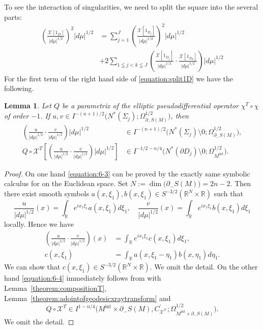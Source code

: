 \documentclass[a4paper,11pt,reqno]{amsart}
\numberwithin{equation}{section}
\newtheorem{lemma}[theorem]{Lemma}
\theoremstyle{definition}
\theoremstyle{remark}
\begin{document}
%
%
To see the interaction of singularities, we need to split the square into the several parts:
%
%
\begin{align}
  \left(
  \frac{\mathcal{X}[1_D]}{\lvert{d\mu}\rvert^{1/2}}
  \right)^2
  \lvert{d\mu}\rvert^{1/2}
& =
  \sum_{j=1}^J
  \left(
  \frac{\mathcal{X}[1_{D_j}]}{\lvert{d\mu}\rvert^{1/2}}
  \right)^2
  \lvert{d\mu}\rvert^{1/2}
\nonumber
\\
& +
  2
  \sum_{1 \leqq j < k \leqq J}
  \left(
  \frac{\mathcal{X}[1_{D_j}]}{\lvert{d\mu}\rvert^{1/2}}
  \cdot
  \frac{\mathcal{X}[1_{D_k}]}{\lvert{d\mu}\rvert^{1/2}}
  \right)
  \lvert{d\mu}\rvert^{1/2}
\label{equation:split1D}
\end{align}
%
%
For the first term of the right hand side of \eqref{equation:split1D} we have the following. 
%
%
\begin{lemma}
\label{theorem:6-2}
Let $Q$ be a parametrix of the elliptic pseudodifferential operator $\chi^T\circ\chi$ of order $-1$. 
If $u,v \in I^{-(n+1)/2}\bigl(N^\ast(\Sigma_j); \Omega_{\partial_-S(M)}^{1/2}\bigr)$, then 
%
%
\begin{align}
  \left(
  \frac{u}{\lvert{d\mu}\rvert^{1/2}}
  \cdot
  \frac{v}{\lvert{d\mu}\rvert^{1/2}}
  \right)
  \lvert{d\mu}\rvert^{1/2}
& \in 
  I^{-(n+1)/2}\bigl(N^\ast(\Sigma_j)\setminus0; \Omega_{\partial_-S(M)}^{1/2}\bigr),
\label{equation:6-3} 
\\
  Q\circ\mathcal{X}^T
  \left[
  \left(
  \frac{u}{\lvert{d\mu}\rvert^{1/2}}
  \cdot
  \frac{v}{\lvert{d\mu}\rvert^{1/2}}
  \right)
  \lvert{d\mu}\rvert^{1/2}
  \right]
& \in 
  I^{-1/2-n/4}
  \bigl(N^\ast(\partial{D_j})\setminus0; \Omega_{M^\text{int}}^{1/2}\bigr).
\label{equation:6-4} 
\end{align}
%
% 
\end{lemma}
%
%
\begin{proof}
On one hand \eqref{equation:6-3} can be proved by the exactly same symbolic calculus 
for \cite[Lemma~5.2]{Chihara} on the Euclidean space. 
Set $N:=\operatorname{dim}\bigl(\partial_-S(M)\bigr)=2n-2$. 
Then there exist smooth symbols $a(x,\xi_1), b(x,\xi_1) \in S^{-3/2}(\mathbb{R}^N\times\mathbb{R})$ such that 
%
%
$$
\frac{u}{\lvert{d\mu}\rvert^{1/2}}(x)
=
\int_\mathbb{R}
e^{ix_1\xi_1}
a(x,\xi_1)
d\xi_1,
\quad
\frac{v}{\lvert{d\mu}\rvert^{1/2}}(x)
=
\int_\mathbb{R}
e^{ix_1\xi_1}
b(x,\xi_1)
d\xi_1
$$
%
%
locally. 
Hence we have 
%
%
\begin{align*}
  \left(
  \frac{u}{\lvert{d\mu}\rvert^{1/2}}
  \cdot
  \frac{v}{\lvert{d\mu}\rvert^{1/2}}
  \right)
  (x)
& =
  \int_{\mathbb{R}}
  e^{ix_1\xi_1}
  c(x,\xi_1)
  d\xi_1,
\\
  c(x,\xi_1)
& =
  \int_{\mathbb{R}}
  a(x,\xi_1-\eta_1)b(x,\eta_1)
  d\eta_1.
\end{align*}
%
%
We can show that $c(x,\xi_1) \in S^{-3/2}(\mathbb{R}^N\times\mathbb{R})$. 
We omit the detail. 
On the other hand \eqref{equation:6-4} immediately follows from \cite[Theorem~25.2.3]{Hoermander4} 
with Lemma~\ref{theorem:compositionT}, Lemma~\ref{theorem:adointofgeodesicxraytransform} and 
%
%
$$
Q\circ\mathcal{X}^T
\in
I^{1-n/4}
\bigl(
M^\text{int}{\times}\partial_-S(M),C_{\mathcal{X^T}}^\prime; \Omega_{M^\text{int}{\times}\partial_-S(M)}^{1/2}
\bigr). 
$$
%
%
We omit the detail. 
\end{proof}
\end{document}
